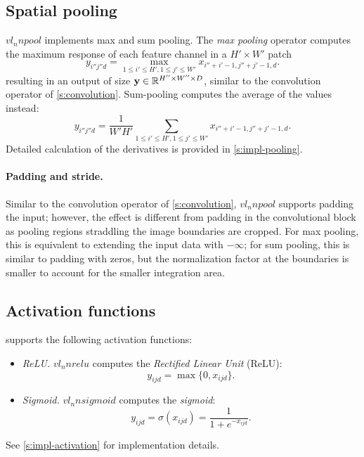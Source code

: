 \subsection{Spatial pooling}\label{s:pooling}

$vl_nnpool$ implements max and sum pooling. The \emph{max pooling} operator computes the maximum response of each feature channel in a $H' \times W'$ patch
\[
y_{i''j''d} = \max_{1\leq i' \leq H', 1 \leq j' \leq W'} x_{i''+i'-1,j''+j'-1,d}.
\]
resulting in an output of size $\mathbf{y}\in\mathbb{R}^{H''\times W'' \times D}$, similar to the convolution operator of \cref{s:convolution}. Sum-pooling computes the average of the values instead:
\[
y_{i''j''d} = \frac{1}{W'H'}
\sum_{1\leq i' \leq H', 1 \leq j' \leq W'} x_{i''+i'-1,j''+j'-1,d}.
\]
Detailed calculation of the derivatives is provided in \cref{s:impl-pooling}.

\paragraph{Padding and stride.} Similar to the convolution operator of \cref{s:convolution}, $vl_nnpool$ supports padding the input; however, the effect is different from padding in the convolutional block as pooling regions straddling the image boundaries are cropped. For max pooling, this is equivalent to extending the input data with $-\infty$; for sum pooling, this is similar to padding with zeros, but the normalization factor at the boundaries is smaller to account for the smaller integration area.

\subsection{Activation functions}\label{s:activation}

\matconvnet supports the following activation functions:
%
\begin{itemize}
	\item \emph{ReLU.} $vl_nnrelu$ computes the \emph{Rectified Linear Unit} (ReLU):
	\[
	y_{ijd} = \max\{0, x_{ijd}\}.
	\]
	
	\item \emph{Sigmoid.} $vl_nnsigmoid$ computes the \emph{sigmoid}:
	\[
	y_{ijd} = \sigma(x_{ijd}) = \frac{1}{1+e^{-x_{ijd}}}.
	\]
\end{itemize}
%
See \cref{s:impl-activation} for implementation details.

